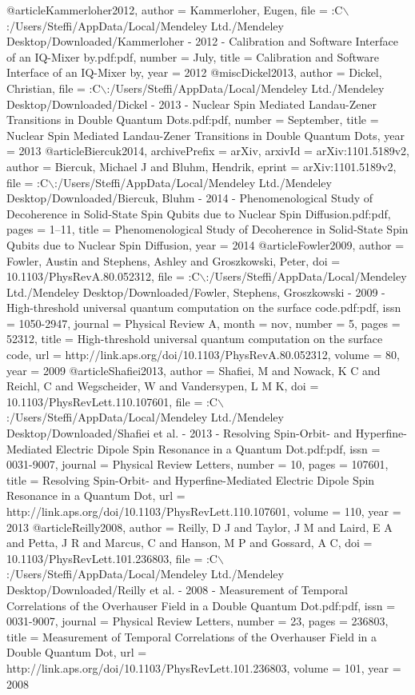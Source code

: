 @article{Kammerloher2012,
author = {Kammerloher, Eugen},
file = {:C$\backslash$:/Users/Steffi/AppData/Local/Mendeley Ltd./Mendeley Desktop/Downloaded/Kammerloher - 2012 - Calibration and Software Interface of an IQ-Mixer by.pdf:pdf},
number = {July},
title = {{Calibration and Software Interface of an IQ-Mixer by}},
year = {2012}
}
@misc{Dickel2013,
author = {Dickel, Christian},
file = {:C$\backslash$:/Users/Steffi/AppData/Local/Mendeley Ltd./Mendeley Desktop/Downloaded/Dickel - 2013 - Nuclear Spin Mediated Landau-Zener Transitions in Double Quantum Dots.pdf:pdf},
number = {September},
title = {{Nuclear Spin Mediated Landau-Zener Transitions in Double Quantum Dots}},
year = {2013}
}
@article{Biercuk2014,
archivePrefix = {arXiv},
arxivId = {arXiv:1101.5189v2},
author = {Biercuk, Michael J and Bluhm, Hendrik},
eprint = {arXiv:1101.5189v2},
file = {:C$\backslash$:/Users/Steffi/AppData/Local/Mendeley Ltd./Mendeley Desktop/Downloaded/Biercuk, Bluhm - 2014 - Phenomenological Study of Decoherence in Solid-State Spin Qubits due to Nuclear Spin Diffusion.pdf:pdf},
pages = {1--11},
title = {{Phenomenological Study of Decoherence in Solid-State Spin Qubits due to Nuclear Spin Diffusion}},
year = {2014}
}
@article{Fowler2009,
author = {Fowler, Austin and Stephens, Ashley and Groszkowski, Peter},
doi = {10.1103/PhysRevA.80.052312},
file = {:C$\backslash$:/Users/Steffi/AppData/Local/Mendeley Ltd./Mendeley Desktop/Downloaded/Fowler, Stephens, Groszkowski - 2009 - High-threshold universal quantum computation on the surface code.pdf:pdf},
issn = {1050-2947},
journal = {Physical Review A},
month = {nov},
number = {5},
pages = {52312},
title = {{High-threshold universal quantum computation on the surface code}},
url = {http://link.aps.org/doi/10.1103/PhysRevA.80.052312},
volume = {80},
year = {2009}
}
@article{Shafiei2013,
author = {Shafiei, M and Nowack, K C and Reichl, C and Wegscheider, W and Vandersypen, L M K},
doi = {10.1103/PhysRevLett.110.107601},
file = {:C$\backslash$:/Users/Steffi/AppData/Local/Mendeley Ltd./Mendeley Desktop/Downloaded/Shafiei et al. - 2013 - Resolving Spin-Orbit- and Hyperfine-Mediated Electric Dipole Spin Resonance in a Quantum Dot.pdf:pdf},
issn = {0031-9007},
journal = {Physical Review Letters},
number = {10},
pages = {107601},
title = {{Resolving Spin-Orbit- and Hyperfine-Mediated Electric Dipole Spin Resonance in a Quantum Dot}},
url = {http://link.aps.org/doi/10.1103/PhysRevLett.110.107601},
volume = {110},
year = {2013}
}
@article{Reilly2008,
author = {Reilly, D J and Taylor, J M and Laird, E A and Petta, J R and Marcus, C and Hanson, M P and Gossard, A C},
doi = {10.1103/PhysRevLett.101.236803},
file = {:C$\backslash$:/Users/Steffi/AppData/Local/Mendeley Ltd./Mendeley Desktop/Downloaded/Reilly et al. - 2008 - Measurement of Temporal Correlations of the Overhauser Field in a Double Quantum Dot.pdf:pdf},
issn = {0031-9007},
journal = {Physical Review Letters},
number = {23},
pages = {236803},
title = {{Measurement of Temporal Correlations of the Overhauser Field in a Double Quantum Dot}},
url = {http://link.aps.org/doi/10.1103/PhysRevLett.101.236803},
volume = {101},
year = {2008}
}
